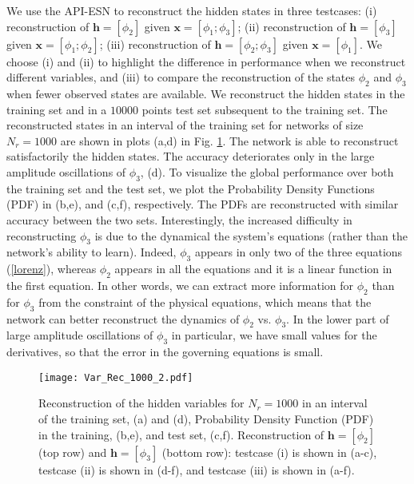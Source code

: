 \documentclass[runningheads]{llncs}
\begin{document}
We use the API-ESN to reconstruct the hidden states in three testcases: (i) reconstruction of $\mathbf{h}=[\phi_2]$ given $\mathbf{x}=[\phi_1;\phi_3]$; (ii) reconstruction of $\mathbf{h}=[\phi_3]$ given $\mathbf{x}=[\phi_1;\phi_2]$; (iii) reconstruction of  $\mathbf{h}=[\phi_2;\phi_3]$ given $\mathbf{x}=[\phi_1]$.
We choose (i) and (ii) to highlight the difference in performance when we reconstruct different variables, and (iii) to compare the reconstruction of the states $\phi_2$ and $\phi_3$ when fewer observed states are available. 
We reconstruct the hidden states in the training set and in a $10000$ points test set subsequent to the training set. The reconstructed states in an interval of the training set for networks of size $N_r=1000$ are shown in plots (a,d) in Fig. \ref{Var_Rec}. The network is able to reconstruct satisfactorily the hidden states. The accuracy deteriorates only in the large amplitude oscillations of $\phi_3$, (d). To visualize the global performance over both the training set and the test set, we plot the Probability Density Functions (PDF) in (b,e), and (c,f), respectively. The PDFs are reconstructed with similar accuracy between the two sets. Interestingly, the increased difficulty in reconstructing $\phi_3$ is due to the dynamical the system's equations (rather than the network's ability to learn). Indeed, $\phi_3$ appears in only two of the three equations (\ref{lorenz}), whereas $\phi_2$ appears in all the equations and it is a linear function in the first equation. In other words, we can extract more information for $\phi_2$ than for $\phi_3$ from the constraint of the physical equations, which means that the network can better reconstruct the dynamics of $\phi_2$ vs. $\phi_3$. In the lower part of large amplitude oscillations of $\phi_3$ in particular, we have small values for the derivatives, so that the error in the governing equations is small.
\begin{figure}
    \centering
    \texttt{[image: Var\_Rec\_1000\_2.pdf]}
    \caption{Reconstruction of the hidden variables for $N_r=1000$ in an interval of the training set, (a) and (d), Probability Density Function (PDF) in the training, (b,e), and test set, (c,f). Reconstruction of $\mathbf{h}=[\phi_2]$ (top row) and $\mathbf{h}=[\phi_3]$ (bottom row): testcase (i) is shown in (a-c), testcase (ii) is shown in (d-f), and testcase (iii) is shown in (a-f).}
    \label{Var_Rec}
\end{figure}
\end{document}
